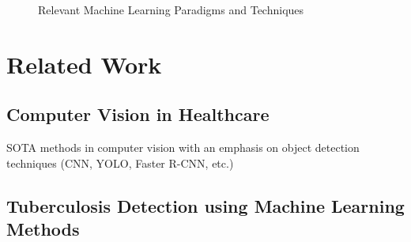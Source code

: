 \documentclass[../main.tex]{subfiles}
\begin{document}

    \newpage

    \begin{figure}
        \centering
        \caption{Relevant Machine Learning Paradigms and Techniques}
        \resizebox*{1.1\columnwidth}{!}{
            \hspace*{-3cm}
            
        }
        \label{fig:relevant_ml_paradigms}
    \end{figure}
    \clearpage
    

    
	
    

    \section{Related Work} \label{related_work}

    \subsection{Computer Vision in Healthcare} \label{sec:computer_vision_sota} 

    SOTA methods in computer vision with an emphasis on object detection techniques (CNN, YOLO, Faster R-CNN, etc.)

    \subsection{Tuberculosis Detection using Machine Learning Methods} \label{sec:ml_tuberculosis_detection} 
\end{document}
